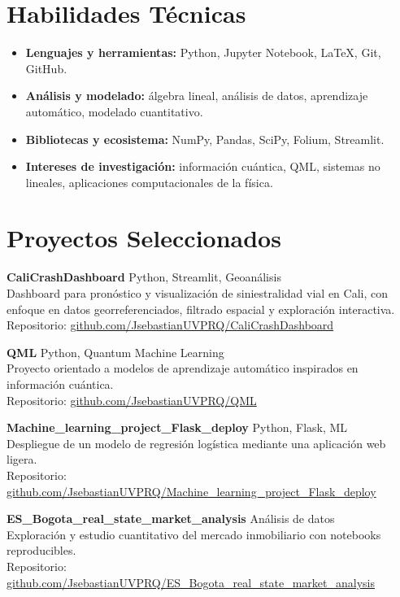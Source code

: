 \documentclass[11pt,a4paper]{article}
\newcommand{\cvitem}[2]{
    \textbf{#1} \hfill {\color{accent} #2}
}
\newcommand{\smallsep}{\vspace{0.35em}}
\begin{document}
\section*{Habilidades T\'ecnicas}
\begin{itemize}
    \item \textbf{Lenguajes y herramientas:} Python, Jupyter Notebook, LaTeX, Git, GitHub.
    \item \textbf{An\'alisis y modelado:} \'algebra lineal, an\'alisis de datos, aprendizaje autom\'atico, modelado cuantitativo.
    \item \textbf{Bibliotecas y ecosistema:} NumPy, Pandas, SciPy, Folium, Streamlit.
    \item \textbf{Intereses de investigaci\'on:} informaci\'on cu\'antica, QML, sistemas no lineales, aplicaciones computacionales de la f\'isica.
\end{itemize}

\section*{Proyectos Seleccionados}
\cvitem{CaliCrashDashboard}{Python, Streamlit, Geoan\'alisis}\\
Dashboard para pron\'ostico y visualizaci\'on de siniestralidad vial en Cali, con enfoque en
datos georreferenciados, filtrado espacial y exploraci\'on interactiva.\\
Repositorio:
\href{https://github.com/JsebastianUVPRQ/CaliCrashDashboard}{github.com/JsebastianUVPRQ/CaliCrashDashboard}

\smallsep
\cvitem{QML}{Python, Quantum Machine Learning}\\
Proyecto orientado a modelos de aprendizaje autom\'atico inspirados en informaci\'on cu\'antica.\\
Repositorio:
\href{https://github.com/JsebastianUVPRQ/QML}{github.com/JsebastianUVPRQ/QML}

\smallsep
\cvitem{Machine\_learning\_project\_Flask\_deploy}{Python, Flask, ML}\\
Despliegue de un modelo de regresi\'on log\'istica mediante una aplicaci\'on web ligera.\\
Repositorio:
\href{https://github.com/JsebastianUVPRQ/Machine_learning_project_Flask_deploy}{github.com/JsebastianUVPRQ/Machine_learning_project_Flask_deploy}

\smallsep
\cvitem{ES\_Bogota\_real\_state\_market\_analysis}{An\'alisis de datos}\\
Exploraci\'on y estudio cuantitativo del mercado inmobiliario con notebooks reproducibles.\\
Repositorio:
\href{https://github.com/JsebastianUVPRQ/ES_Bogota_real_state_market_analysis}{github.com/JsebastianUVPRQ/ES_Bogota_real_state_market_analysis}
\end{document}

